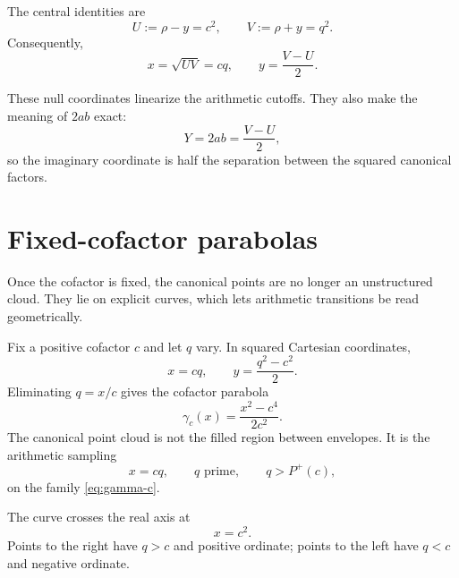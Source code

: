 \documentclass[11pt]{article}
\theoremstyle{definition}
\newcommand{\Pplus}{P^{+}}
\newcommand{\1}{\mathbf{1}}
\begin{document}
The central identities are
\begin{equation}
 \boxed{
 U:=\rho-y=c^2,
 \qquad
 V:=\rho+y=q^2.
 }
 \label{eq:UV}
\end{equation}
Consequently,
\begin{equation}
 x=\sqrt{UV}=cq,
 \qquad
 y=\frac{V-U}{2}.
 \label{eq:xy-UV}
\end{equation}

These null coordinates linearize the arithmetic cutoffs.  They also make the meaning of $2ab$ exact:
\begin{equation}
 \boxed{Y=2ab=\frac{V-U}{2},}
 \label{eq:Y-null}
\end{equation}
so the imaginary coordinate is half the separation between the squared canonical factors.


\section{Fixed-cofactor parabolas}
\label{sec:cofactor-curves}

Once the cofactor is fixed, the canonical points are no longer an unstructured cloud.  They lie on explicit curves, which lets arithmetic transitions be read geometrically.

Fix a positive cofactor $c$ and let $q$ vary.  In squared Cartesian coordinates,
\begin{equation}
 x=cq,
 \qquad
 y=\frac{q^2-c^2}{2}.
 \label{eq:curve-param}
\end{equation}
Eliminating $q=x/c$ gives the cofactor parabola
\begin{equation}
 \boxed{
 \gamma_c(x)
 =\frac{x^2-c^4}{2c^2}.
 }
 \label{eq:gamma-c}
\end{equation}
The canonical point cloud is not the filled region between envelopes.  It is the arithmetic sampling
\begin{equation}
 x=cq,
 \qquad
 q\text{ prime},
 \qquad
 q>\Pplus(c),
 \label{eq:curve-sampling}
\end{equation}
on the family \cref{eq:gamma-c}.

The curve crosses the real axis at
\begin{equation}
 x=c^2.
 \label{eq:curve-axis-cross}
\end{equation}
Points to the right have $q>c$ and positive ordinate; points to the left have $q<c$ and negative ordinate.
\end{document}

